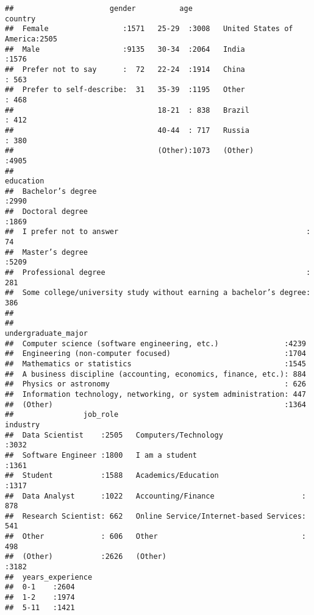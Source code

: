 \documentclass[
]{article}
\begin{document}
\begin{verbatim}
##                      gender          age                           country    
##  Female                 :1571   25-29  :3008   United States of America:2505  
##  Male                   :9135   30-34  :2064   India                   :1576  
##  Prefer not to say      :  72   22-24  :1914   China                   : 563  
##  Prefer to self-describe:  31   35-39  :1195   Other                   : 468  
##                                 18-21  : 838   Brazil                  : 412  
##                                 40-44  : 717   Russia                  : 380  
##                                 (Other):1073   (Other)                 :4905  
##                                                              education   
##  Bachelor’s degree                                                :2990  
##  Doctoral degree                                                  :1869  
##  I prefer not to answer                                           :  74  
##  Master’s degree                                                  :5209  
##  Professional degree                                              : 281  
##  Some college/university study without earning a bachelor’s degree: 386  
##                                                                          
##                                                    undergraduate_major
##  Computer science (software engineering, etc.)               :4239    
##  Engineering (non-computer focused)                          :1704    
##  Mathematics or statistics                                   :1545    
##  A business discipline (accounting, economics, finance, etc.): 884    
##  Physics or astronomy                                        : 626    
##  Information technology, networking, or system administration: 447    
##  (Other)                                                     :1364    
##                job_role                                      industry   
##  Data Scientist    :2505   Computers/Technology                  :3032  
##  Software Engineer :1800   I am a student                        :1361  
##  Student           :1588   Academics/Education                   :1317  
##  Data Analyst      :1022   Accounting/Finance                    : 878  
##  Research Scientist: 662   Online Service/Internet-based Services: 541  
##  Other             : 606   Other                                 : 498  
##  (Other)           :2626   (Other)                               :3182  
##  years_experience
##  0-1    :2604    
##  1-2    :1974    
##  5-11   :1421    

\end{verbatim}
\end{document}
